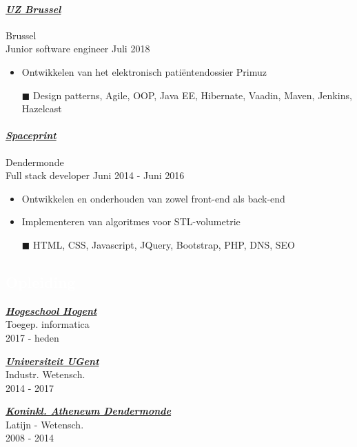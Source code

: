 \documentclass[a4paper, twoside]{article}
\begin{document}
\paragraph{\textbf{\textit{\href{https://uzbrussel.be }{\textcolor{blueDark}{ UZ Brussel }}}}} \hfill\small Brussel \\
Junior software engineer \hfill\small
Juli 2018
\begin{itemize}
\itemsep-0.2em
\item Ontwikkelen van het elektronisch patiëntendossier Primuz
\item[\color{orange}$\blacksquare$] Design patterns, Agile, OOP, Java EE, Hibernate, Vaadin, Maven, Jenkins, Hazelcast
\end{itemize}
\paragraph{\textbf{\textit{\href{https:// }{\textcolor{blueDark}{ Spaceprint }}}}} \hfill\small Dendermonde \\
Full stack developer \hfill\small
Juni 2014
- Juni 2016
\begin{itemize}
\itemsep-0.2em
\item Ontwikkelen en onderhouden van zowel front-end als back-end
\item Implementeren van algoritmes voor STL-volumetrie
\item[\color{orange}$\blacksquare$] HTML, CSS, Javascript, JQuery, Bootstrap, PHP, DNS, SEO
\end{itemize}
\begin{mdframed}
\section*{\textcolor{white}{ Opleiding }}
\end{mdframed}
\begin{multicols}{ 3 }
\setlength{\parindent}{0pt}
\par
\textbf{\textit{\href{https://hogent.be }{\textcolor{blueDark}{ Hogeschool Hogent }}}}\\
Toegep. informatica\\ \small 2017 - heden
\setlength{\parindent}{0pt}
\par
\textbf{\textit{\href{https://ugent.be }{\textcolor{blueDark}{ Universiteit UGent }}}}\\
Industr. Wetensch.\\ \small 2014 - 2017
\setlength{\parindent}{0pt}
\par
\textbf{\textit{\href{https://kad.be }{\textcolor{blueDark}{ Koninkl. Atheneum Dendermonde }}}}\\
Latijn - Wetensch.\\ \small 2008 - 2014
\end{multicols}
\end{document}
